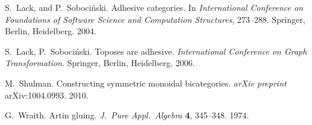 \documentclass{amsart}
\theoremstyle{remark}
\theoremstyle{definition}
\begin{document}
\begin{thebibliography}{99}
 S.\ Lack, and P.\ Soboci\'{n}ski. Adhesive
  categories. In \emph{International Conference on Foundations of
    Software Science and Computation Structures}, 273--288. Springer,
  Berlin, Heidelberg. 2004.

 S.~Lack, P.~Soboci\'{n}ski. Toposes are adhesive. \emph{International Conference on Graph Transformation}. Springer, Berlin, Heidelberg. 2006.

 M.~Shulman. Constructing symmetric monoidal bicategories. \emph{arXiv preprint} arXiv:1004.0993. 2010.
  
 G.\ Wraith. Artin gluing. \emph{J.\ Pure
    Appl.\ Algebra} \textbf{4}, 345--348. 1974.

\end{thebibliography}
\end{document}
